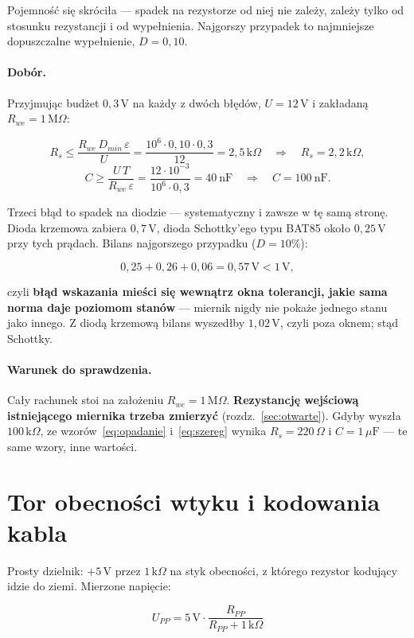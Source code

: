 \documentclass[a4paper,11pt]{article}
\newcommand{\ohm}{\,\Omega}
\newcommand{\kohm}{\,\mathrm{k}\Omega}
\newcommand{\Mohm}{\,\mathrm{M}\Omega}
\newcommand{\volt}{\,\mathrm{V}}
\begin{document}
Pojemność się skróciła --- spadek na rezystorze od niej nie zależy, zależy tylko od
stosunku rezystancji i od wypełnienia. Najgorszy przypadek to najmniejsze
dopuszczalne wypełnienie, $D=0{,}10$.

\paragraph{Dobór.} Przyjmując budżet $0{,}3\volt$ na każdy z dwóch błędów,
$U=12\volt$ i zakładaną $R_{we}=1\Mohm$:

\[
R_s \le \frac{R_{we}\,D_{min}\,\varepsilon}{U}
     = \frac{10^6\cdot0{,}10\cdot0{,}3}{12}=2{,}5\kohm
\quad\Rightarrow\quad R_s = 2{,}2\kohm,
\]
\[
C \ge \frac{U\,T}{R_{we}\,\varepsilon}
   = \frac{12\cdot10^{-3}}{10^{6}\cdot0{,}3}=40\ \mathrm{nF}
\quad\Rightarrow\quad C = 100\ \mathrm{nF}.
\]

Trzeci błąd to spadek na diodzie --- systematyczny i zawsze w tę samą stronę.
Dioda krzemowa zabiera $0{,}7\volt$, dioda Schottky'ego typu BAT85 około
$0{,}25\volt$ przy tych prądach. Bilans najgorszego przypadku ($D=10\%$):

\[
0{,}25 + 0{,}26 + 0{,}06 = 0{,}57\volt < 1\volt ,
\]

czyli \textbf{błąd wskazania mieści się wewnątrz okna tolerancji, jakie sama norma
daje poziomom stanów} --- miernik nigdy nie pokaże jednego stanu jako innego.
Z diodą krzemową bilans wyszedłby $1{,}02\volt$, czyli poza oknem; stąd Schottky.

\paragraph{Warunek do sprawdzenia.} Cały rachunek stoi na założeniu
$R_{we}=1\Mohm$. \textbf{Rezystancję wejściową istniejącego miernika trzeba
zmierzyć} (rozdz.~\ref{sec:otwarte}). Gdyby wyszła $100\kohm$, ze
wzorów~\eqref{eq:opadanie} i~\eqref{eq:szereg} wynika $R_s=220\ohm$
i $C=1\,\mu\mathrm{F}$ --- te same wzory, inne wartości.

\section{Tor obecności wtyku i kodowania kabla}
\label{sec:pp}

Prosty dzielnik: $+5\volt$ przez $1\kohm$ na styk obecności, z którego rezystor
kodujący idzie do ziemi. Mierzone napięcie:

\begin{equation}
U_{PP}=5\volt\cdot\frac{R_{PP}}{R_{PP}+1\kohm}
\end{equation}
\end{document}
